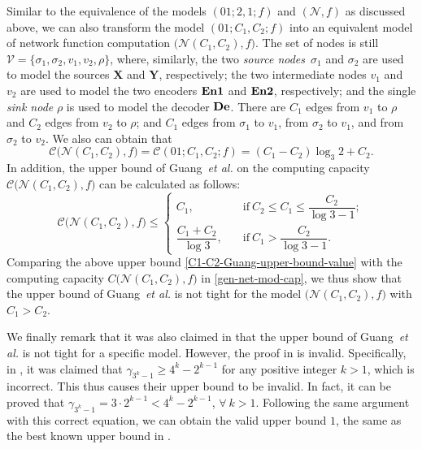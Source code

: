 \documentclass[11pt,draftclsnofoot,onecolumn]{IEEEtran}
\newcommand{\Enone}{\bf{En1}}
\newcommand{\Entwo}{\bf{En2}}
\newcommand{\De}{\bf{De}}
\begin{document}
{Similar to the equivalence of the models $(01;2,1;f)$ and $(\mathcal{N},f)$ as discussed above, we can also transform the model $(01;C_1,C_2;f)$ into an equivalent model of network function computation $\big(\mathcal{N}(C_1,C_2),f\big)$. The set of nodes is still $\mathcal{V}=\{\sigma_1,\sigma_2,v_1,v_2,\rho\}$, where, similarly, the two \emph{source nodes}~$\sigma_1$ and $\sigma_2$ are used to model the sources $\boldsymbol{X}$ and $\boldsymbol{Y}$, respectively; the two intermediate nodes $v_1$ and $v_2$ are used to model the two encoders $\Enone$ and $\Entwo$, respectively; and the single \emph{sink node} $\rho$ is used to model the decoder $\De$. There are $C_1$ edges from $v_1$ to $\rho$ and $C_2$ edges from $v_2$ to $\rho$; and $C_1$ edges from $\sigma_1$ to $v_1$, from $\sigma_2$ to $v_1$, and from $\sigma_2$ to $v_2$. We also can obtain that
 \begin{equation}
 \mathcal{C}\big(\mathcal{N}(C_1,C_2),f\big)=\mathcal{C}(01;C_1,C_2;f)=(C_1-C_2)\log_{3}2+C_2.\label{gen-net-mod-cap}
 \end{equation}
In addition, the upper bound of Guang~\emph{et al.} \cite{Guang_Improved_upper_bound} on the computing capacity $\mathcal{C}\big(\mathcal{N}(C_1,C_2),f\big)$ can be calculated as follows:
\begin{equation}
\mathcal{C}\big(\mathcal{N}(C_1,C_2),f\big)\leq
\begin{cases}
 C_1,\quad&\text{if}~C_2\leq C_1\leq \dfrac{C_2}{\log3-1};\\
 \dfrac{C_1+C_2}{\log 3},\quad&\text{if}~C_1> \dfrac{C_2}{\log3-1}.
\end{cases}\label{C1-C2-Guang-upper-bound-value}
\end{equation}
Comparing the above upper bound \eqref{C1-C2-Guang-upper-bound-value} with the computing capacity
$C\big(\mathcal{N}(C_1,C_2),f\big)$ in \eqref{gen-net-mod-cap},  we thus show that the upper bound of Guang~\emph{et al.} \cite{Guang_Improved_upper_bound} is not tight for the model  $\big(\mathcal{N}(C_1,C_2),f\big)$ with $C_1>C_2$.

We finally remark that it was also claimed in \cite{Wang-Tightness_upper_bound} that the upper bound of Guang~\emph{et al.} \cite{Guang_Improved_upper_bound} is not tight for a specific model. However, the proof in \cite{Wang-Tightness_upper_bound} is invalid. Specifically, in \cite[Lemma~1]{Wang-Tightness_upper_bound}, it was claimed that $\gamma_{3^{k}-1}\geq 4^{k}-2^{k-1}$ for any positive integer $k>1$, which is incorrect. This thus causes their upper bound to be invalid. In fact, it can be proved that $\gamma_{3^{k}-1}=3\cdot 2^{k-1}<4^{k}-2^{k-1}$, $\forall~k>1$. Following the same argument with this correct equation, we can obtain the valid upper bound $1$, the same as the best known upper bound in \cite{Guang_Improved_upper_bound}.


}
\end{document}
